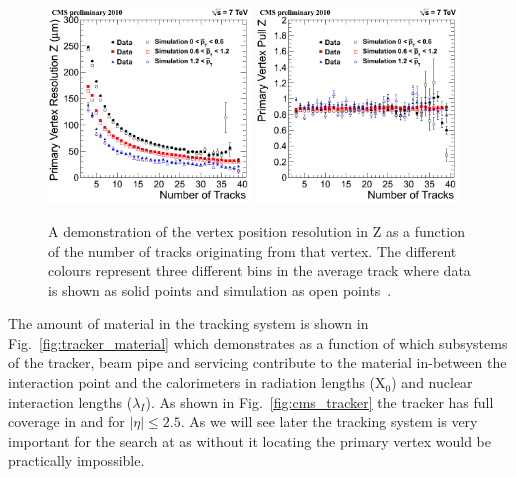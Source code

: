 \begin{figure}
  \includegraphics[width=0.48\textwidth]{cms_experiment/plots/ResZ_byPt.png}
  \includegraphics[width=0.48\textwidth]{cms_experiment/plots/PullZ_byPt.png}
  \caption[Vertex resolution]{A demonstration of the vertex position resolution in Z as a function of the number of tracks originating from that vertex. The different colours represent three different bins in the average track \pT where data is shown as solid points and simulation as open points~\cite{cms-tracker-performance-2010}.}
  \label{fig:tracker_vertex_resolution}
\end{figure}

The amount of material in the tracking system is shown in Fig.~\ref{fig:tracker_material} which demonstrates as a function of \eta which subsystems of the tracker, beam pipe and servicing contribute to the material in-between the interaction point and the calorimeters in radiation lengths (X$_{0}$) and nuclear interaction lengths ($\lambda_{I}$). As shown in Fig.~\ref{fig:cms_tracker} the tracker has full coverage in \phi and for $|\eta|\leq2.5$. As we will see later the tracking system is very important for the \Hgg search at \CMS as without it locating the primary vertex would be practically impossible.

